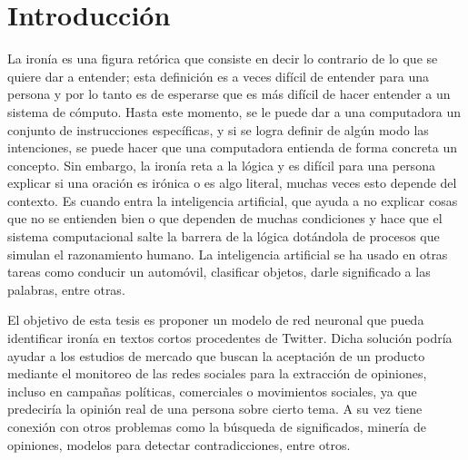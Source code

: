 
\chapter{Introducción}\label{cap.introduccion}
\setcounter{page}{1}
\onehalfspacing

\par La ironía es una figura retórica que consiste en decir lo contrario de lo que se quiere dar a entender; esta definición es a veces difícil de entender para una persona y por lo tanto es de esperarse que es más difícil de hacer entender a un sistema de cómputo. Hasta este momento, se le puede dar a una computadora un conjunto de instrucciones específicas, y si se logra definir de algún modo las intenciones, se puede hacer que una computadora entienda de forma concreta un concepto. Sin embargo, la ironía reta a la lógica y es difícil para una persona explicar si una oración es irónica o es algo literal, muchas veces esto depende del contexto. Es cuando entra la inteligencia artificial, que ayuda a no explicar cosas que no se entienden bien o que dependen de muchas condiciones y hace que el sistema computacional salte la barrera de la lógica dotándola de procesos que simulan el razonamiento humano. La inteligencia artificial se ha usado en otras tareas como conducir un automóvil, clasificar objetos, darle significado a las palabras, entre otras.

\par El objetivo de esta tesis es proponer un modelo de red neuronal que pueda identificar ironía en textos cortos procedentes de Twitter. Dicha solución podría ayudar a los estudios de mercado que buscan la aceptación de un producto mediante el monitoreo de las redes sociales para la extracción de opiniones, incluso en campañas políticas, comerciales o movimientos sociales, ya que predeciría la opinión real de una persona sobre cierto tema. A su vez tiene conexión con otros problemas como la búsqueda de significados, minería de opiniones, modelos para detectar contradicciones, entre otros.



